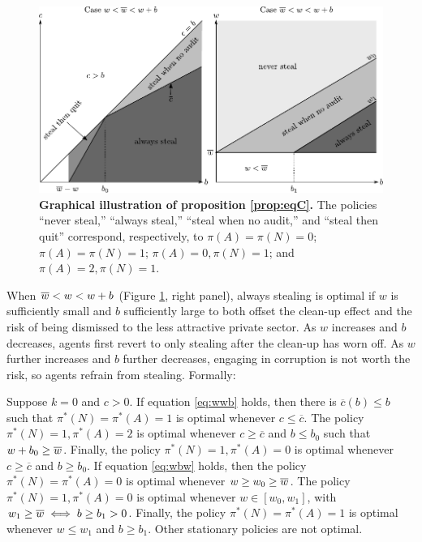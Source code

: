 {\begin{figure}[H]
    \centering
    \includegraphics{chapters/chapter_2/figures_theory/eq_with_c.pdf}
    \caption{{\bf Graphical illustration of proposition \ref{prop:eqC}.} The policies ``never steal,'' ``always steal,'' ``steal when no audit,'' and ``steal then quit'' correspond, respectively, to $\pi(A) = \pi(N) = 0$; $\pi(A) = \pi(N) = 1$; $\pi(A) = 0, \pi(N) = 1$;  and $\pi(A) = 2, \pi(N) = 1$.}
    \label{fig:eqC}
\end{figure}

When $\overline{w} < w < w+b$ (Figure \ref{fig:eqC}, right panel), always stealing is optimal if $w$ is sufficiently small and $b$ sufficiently large to both offset the clean-up effect and the risk of being dismissed to the less attractive private sector. As $w$ increases and $b$ decreases, agents first revert to only stealing after the clean-up has worn off. As $w$ further increases and $b$ further decreases, engaging in corruption is not worth the risk, so agents refrain from stealing. Formally:  

\begin{proposition}
    \label{prop:eqC}
    Suppose $k = 0$ and $c > 0$. If equation \ref{eq:wwb} holds, then there is $\overline{c}(b) \leq b$ such that $\pi^*(N)=\pi^*(A)=1$ is optimal whenever $c \leq \overline{c}$. The policy $\pi^*(N)=1, \pi^*(A)=2$ is optimal whenever $c \geq \overline{c}$ and $b \leq b_0$ such that $w+b_0 \geq \overline{w}$. Finally, the policy $\pi^*(N)=1, \pi^*(A)=0$ is optimal whenever $c \geq \overline{c}$ and $b \geq b_0$. If equation \ref{eq:wbw} holds, then the policy $\pi^*(N)=\pi^*(A)=0$ is optimal whenever $w \geq w_0 \geq \overline{w}$. The policy $\pi^*(N)=1, \pi^*(A)=0$ is optimal whenever $w \in [w_0,w_1]$, with $w_1 \geq \overline{w} \iff b \geq b_1 > 0$. Finally, the policy $\pi^*(N)=\pi^*(A)=1$ is optimal whenever $w \leq w_1$ and $b \geq b_1$. Other stationary policies are not optimal. 
\end{proposition}

}
